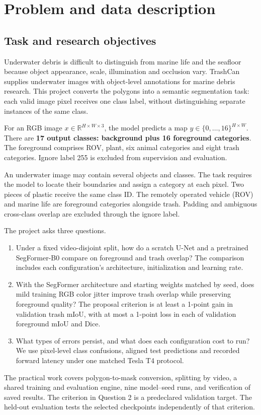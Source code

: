\section{Problem and data description}
\subsection{Task and research objectives}
Underwater debris is difficult to distinguish from marine life and the seafloor because object appearance, scale, illumination and occlusion vary. TrashCan supplies underwater images with object-level annotations for marine debris research\cite{trashcan}. This project converts the polygons into a semantic segmentation task: each valid image pixel receives one class label, without distinguishing separate instances of the same class.

For an RGB image $x\in\mathbb{R}^{H\times W\times 3}$, the model predicts a map $\hat y\in\{0,\ldots,16\}^{H\times W}$. There are \textbf{17 output classes: background plus 16 foreground categories}. The foreground comprises ROV, plant, six animal categories and eight trash categories. Ignore label 255 is excluded from supervision and evaluation.

An underwater image may contain several objects and classes. The task requires the model to locate their boundaries and assign a category at each pixel. Two pieces of plastic receive the same class ID. The remotely operated vehicle (ROV) and marine life are foreground categories alongside trash. Padding and ambiguous cross-class overlap are excluded through the ignore label.

The project asks three questions.
\begin{enumerate}
\item Under a fixed video-disjoint split, how do a scratch U-Net and a pretrained SegFormer-B0 compare on foreground and trash overlap? The comparison includes each configuration's architecture, initialization and learning rate.
\item With the SegFormer architecture and starting weights matched by seed, does mild training RGB color jitter improve trash overlap while preserving foreground quality? The proposal criterion is at least a 1-point gain in validation trash mIoU, with at most a 1-point loss in each of validation foreground mIoU and Dice.
\item What types of errors persist, and what does each configuration cost to run? We use pixel-level class confusions, aligned test predictions and recorded forward latency under one matched Tesla T4 protocol.
\end{enumerate}
The practical work covers polygon-to-mask conversion, splitting by video, a shared training and evaluation engine, nine model--seed runs, and verification of saved results. The criterion in Question 2 is a predeclared validation target. The held-out evaluation tests the selected checkpoints independently of that criterion.

